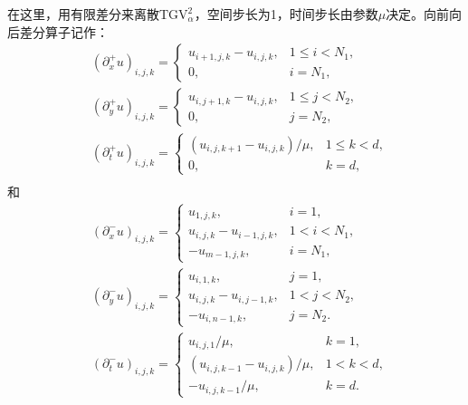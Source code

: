在这里，用有限差分来离散$\mathrm{TGV}_{\alpha}^2$，空间步长为1，时间步长由参数$\mu$决定。向前向后差分算子记作：
\begin{align*}
&(\partial_x^+u)_{i,j,k}=\begin{cases}
u_{i+1,j,k}-u_{i,j,k},&1\leq i<N_1,\\
0,&i=N_1,
\end{cases} \\
&(\partial_y^+u)_{i,j,k}=\begin{cases}
u_{i,j+1,k}-u_{i,j,k},&1\leq j<N_2,\\
0, &j=N_2,
\end{cases}\\
&(\partial_t^+u)_{i,j,k}=\begin{cases}
(u_{i,j,k+1}-u_{i,j,k})/\mu,&1\leq k<d,\\
0, &k=d,
\end{cases}\\
\end{align*}
和
\begin{align*}
&(\partial_x^-u)_{i,j,k}=\begin{cases}
u_{1,j,k},&i=1,\\
u_{i,j,k}-u_{i-1,j,k},&1<i<N_1,\\
-u_{m-1,j,k},&i=N_1,
\end{cases}\\
&(\partial_y^-u)_{i,j,k}=\begin{cases}
u_{i,1,k},&j=1,\\
u_{i,j,k}-u_{i,j-1,k},&1<j<N_2,\\
-u_{i,n-1,k},&j=N_2.
\end{cases}\\
&(\partial_t^-u)_{i,j,k}=\begin{cases}
u_{i,j,1}/\mu,&k=1,\\
(u_{i,j,k-1}-u_{i,j,k})/\mu,&1<k<d,\\
-u_{i,j,k-1}/\mu,&k=d.
\end{cases}\\
\end{align*}

